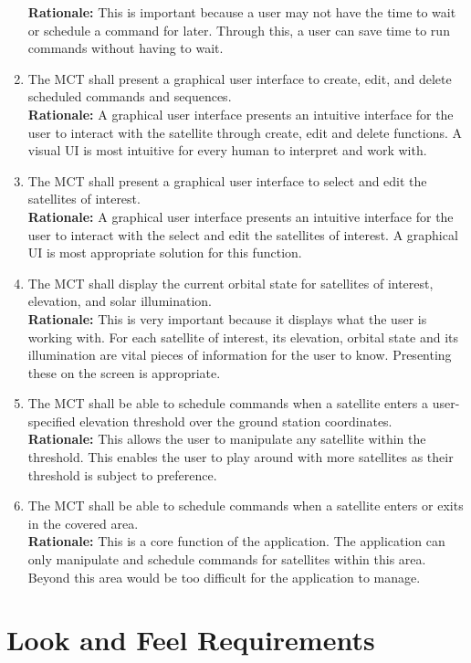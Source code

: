 \documentclass[12pt]{article}
\begin{document}
\begin{enumerate}
    \textbf{Rationale:} This is important because a user may not have the time to wait or schedule a command for later. Through this, a user can save time to run commands without having to wait. 
    \item The MCT shall present a graphical user interface to create, edit, and delete scheduled commands and sequences. \\
    \textbf{Rationale:} A graphical user interface presents an intuitive interface for the user to interact with the satellite through create, edit and delete functions. A visual UI is most intuitive for every human to interpret and work with. 
    \item The MCT shall present a graphical user interface to select and edit the satellites of interest. \\
    \textbf{Rationale:} A graphical user interface presents an intuitive interface for the user to interact with the select and edit the satellites of interest. A graphical UI is most appropriate solution for this function.
    \item The MCT shall display the current orbital state for satellites of interest, elevation, and solar illumination. \\
    \textbf{Rationale:} This is very important because it displays what the user is working with. For each satellite of interest, its elevation, orbital state and its illumination are vital pieces of information for the user to know. Presenting these on the screen is appropriate. 
    \item The MCT shall be able to schedule commands when a satellite enters a user-specified elevation threshold over the ground station coordinates. \\
    \textbf{Rationale:} This allows the user to manipulate any satellite within the threshold. This enables the user to play around with more satellites as their threshold is subject to preference. 
    \item  The MCT shall be able to schedule commands when a satellite enters or exits in the covered area. \\
    \textbf{Rationale:} This is a core function of the application. The application can only manipulate and schedule commands for satellites within this area. Beyond this area would be too difficult for the application to manage. 

\end{enumerate}

\section{Look and Feel Requirements}
\end{document}
